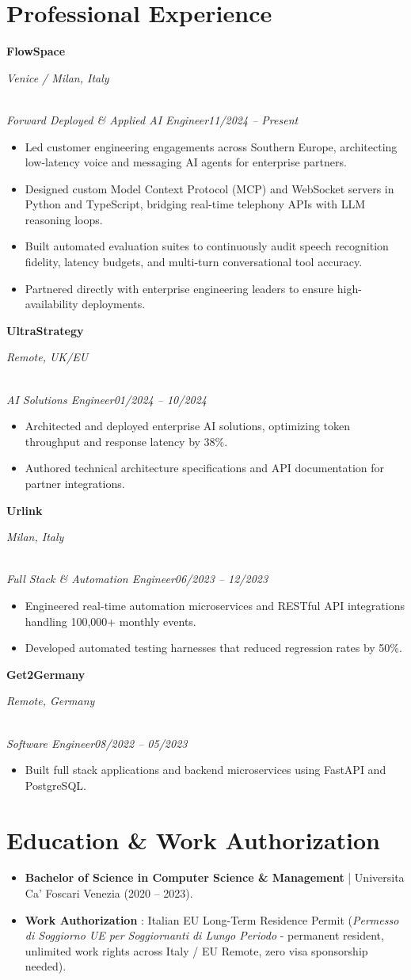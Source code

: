 \documentclass[a4paper,10pt]{article}
\newcommand{\role}[4]{\vspace{3pt}\noindent\hspace{0.6em}\parbox[t]{0.38\textwidth}{\raggedright\textbf{#1}}\hfill\parbox[t]{0.58\textwidth}{\raggedleft\textit{#2}}\\{\textit{#3}\hfill\textit{#4}}\vspace{1pt}}
\begin{document}
\section{Professional Experience}

\role{FlowSpace}{Venice / Milan, Italy}{Forward Deployed \& Applied AI Engineer}{11/2024 -- Present}
\begin{itemize}
\item Led customer engineering engagements across Southern Europe, architecting low-latency voice and messaging AI agents for enterprise partners.
\item Designed custom Model Context Protocol (MCP) and WebSocket servers in Python and TypeScript, bridging real-time telephony APIs with LLM reasoning loops.
\item Built automated evaluation suites to continuously audit speech recognition fidelity, latency budgets, and multi-turn conversational tool accuracy.
\item Partnered directly with enterprise engineering leaders to ensure high-availability deployments.
\end{itemize}

\role{UltraStrategy}{Remote, UK/EU}{AI Solutions Engineer}{01/2024 -- 10/2024}
\begin{itemize}
\item Architected and deployed enterprise AI solutions, optimizing token throughput and response latency by 38\%.
\item Authored technical architecture specifications and API documentation for partner integrations.
\end{itemize}

\role{Urlink}{Milan, Italy}{Full Stack \& Automation Engineer}{06/2023 -- 12/2023}
\begin{itemize}
\item Engineered real-time automation microservices and RESTful API integrations handling 100,000+ monthly events.
\item Developed automated testing harnesses that reduced regression rates by 50\%.
\end{itemize}

\role{Get2Germany}{Remote, Germany}{Software Engineer}{08/2022 -- 05/2023}
\begin{itemize}
\item Built full stack applications and backend microservices using FastAPI and PostgreSQL.
\end{itemize}

\section{Education \& Work Authorization}
\begin{itemize}
\item \textbf{Bachelor of Science in Computer Science \& Management} | Universita Ca' Foscari Venezia (2020 -- 2023).
\item \textbf{Work Authorization} : Italian EU Long-Term Residence Permit (\textit{Permesso di Soggiorno UE per Soggiornanti di Lungo Periodo} - permanent resident, unlimited work rights across Italy / EU Remote, zero visa sponsorship needed).
\end{itemize}
\end{document}
